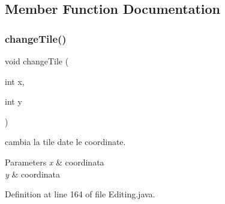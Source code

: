 \subsection{Member Function Documentation}
\mbox{\label{classscenes_1_1_editing_afbbb0a60fd2d899ff81c1715fce5fc73}} 
\subsubsection{\texorpdfstring{change\+Tile()}{changeTile()}}
{\footnotesize\ttfamily void change\+Tile (\begin{DoxyParamCaption}\item[{int}]{x,  }\item[{int}]{y }\end{DoxyParamCaption})\hspace{0.3cm}{\ttfamily [private]}}



cambia la tile date le coordinate. 


\begin{DoxyParams}{Parameters}
{\em x} & coordinata \\
\hline
{\em y} & coordinata \\
\hline
\end{DoxyParams}


Definition at line 164 of file Editing.\+java.

